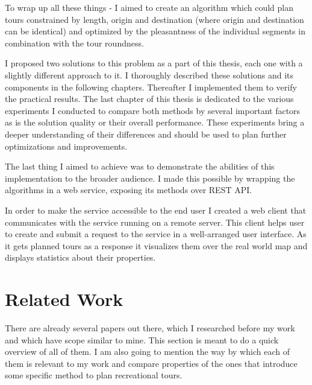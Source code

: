 \documentclass{ctuthesis}
\begin{document}
To wrap up all these things - I aimed to create an algorithm which could plan tours constrained by length, origin and destination (where origin and destination can be identical) and optimized by the pleasantness of the individual segments in combination with the tour roundness. \par 
I proposed two solutions to this problem as a part of this thesis, each one with a slightly different approach to it. I thoroughly described these solutions and its components in the following chapters. Thereafter I implemented them to verify the practical results. The last chapter of this thesis is dedicated to the various experiments I conducted to compare both methods by several important factors as is the solution quality or their overall performance. These experiments bring a deeper understanding of their differences and should be used to plan further optimizations and improvements. \par
The last thing I aimed to achieve was to demonstrate the abilities of this implementation to the broader audience. I made this possible by wrapping the algorithms in a web service, exposing its methods over REST API.\cite{rest} \par In order to make the service accessible to the end user I created a web client that communicates with the service running on a remote server. This client helps user to create and submit a request to the service in a well-arranged user interface. As it gets planned tours as a response it visualizes them over the real world map and displays statistics about their properties. \par

\chapter{Related Work}
There are already several papers out there, which I researched before my work and which have scope similar to mine. This section is meant to do a quick overview of all of them. I am also going to mention the way by which each of them is relevant to my work and compare properties of the ones that introduce some specific method to plan recreational tours.\par
\end{document}
